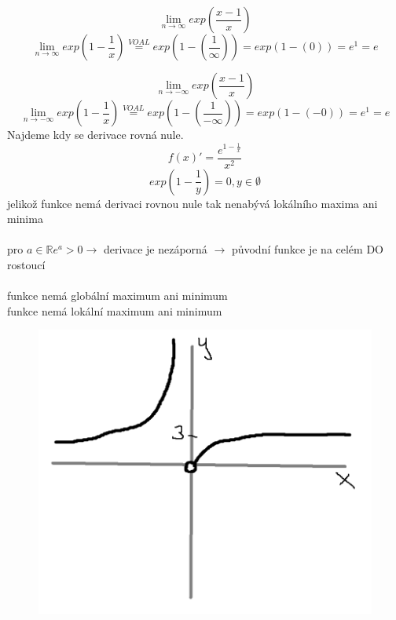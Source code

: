 \documentclass[a4paper,titlepage]{article}
\begin{document}
$$
\lim_{n \to \infty}exp(\frac{x-1}{x})
$$ $$
\lim_{n \to \infty}exp(1-\frac{1}{x}) \stackrel{VOAL}{=} exp(1-(\frac{1}{\infty})) = exp(1-(0))  = e^{1} = e
$$ 

$$
\lim_{n \to -\infty}exp(\frac{x-1}{x})
$$ $$
\lim_{n \to -\infty}exp(1-\frac{1}{x}) \stackrel{VOAL}{=} exp(1-(\frac{1}{-\infty})) = exp(1-(-0))  = e^{1} = e
$$ 
Najdeme kdy se derivace rovná nule.\\
$$ f(x)' = \frac{e^{1-\frac{1}{x}}}{x^2} $$
$$ exp(1-\frac{1}{y}) = 0, y \in \emptyset$$
jelikož funkce nemá derivaci rovnou nule tak nenabývá lokálního maxima ani minima\\
\\
pro $ a \in \mathbb{R}  e^a > 0 \to $ derivace je nezáporná $\to$ původní funkce je na celém DO rostoucí\\
\\
funkce nemá globální maximum ani minimum\\
funkce nemá lokální maximum ani minimum
\begin{figure}[h]
	\includegraphics[scale=0.2]{graf_1_zapocet_mataliza.png}
\end{figure}
\end{document}
